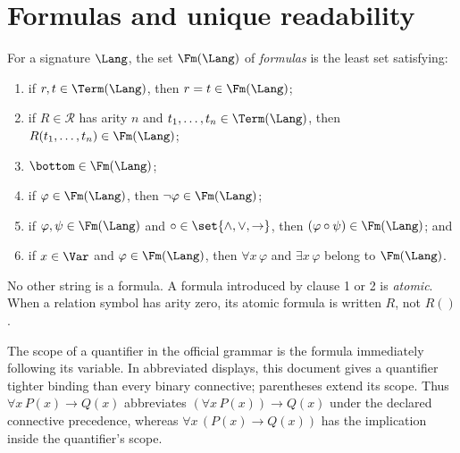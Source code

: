 \section{Formulas and unique readability}
\label{sec:fol-syntax-semantics-02}

\begin{definition}
For a signature \(\Lang\), the set \(\Fm(\Lang)\) of \emph{formulas} is the
least set satisfying:
\begin{enumerate}
  \item if \(r,t\in\Term(\Lang)\), then \(r=t\in\Fm(\Lang)\);
  \item if \(R\in\mathcal R\) has arity \(n\) and
        \(t_1,\ldots,t_n\in\Term(\Lang)\), then
        \(R(t_1,\ldots,t_n)\in\Fm(\Lang)\);
  \item \(\bottom\in\Fm(\Lang)\);
  \item if \(\varphi\in\Fm(\Lang)\), then
        \(\neg\varphi\in\Fm(\Lang)\);
  \item if \(\varphi,\psi\in\Fm(\Lang)\) and
        \(\circ\in\set{\land,\lor,\to}\), then
        \((\varphi\circ\psi)\in\Fm(\Lang)\); and
  \item if \(x\in\Var\) and \(\varphi\in\Fm(\Lang)\), then
        \(\forall x\,\varphi\) and \(\exists x\,\varphi\) belong to
        \(\Fm(\Lang)\).
\end{enumerate}
No other string is a formula.  A formula introduced by clause 1 or 2 is
\emph{atomic}.  When a relation symbol has arity zero, its atomic formula is
written \(R\), not \(R()\).
\end{definition}

The scope of a quantifier in the official grammar is the formula immediately
following its variable.  In abbreviated displays, this document gives a
quantifier tighter binding than every binary connective; parentheses extend
its scope.  Thus
\(\forall x\,P(x)\to Q(x)\) abbreviates
\((\forall x\,P(x))\to Q(x)\) under the declared connective precedence,
whereas \(\forall x\,(P(x)\to Q(x))\) has the implication inside the
quantifier's scope.

